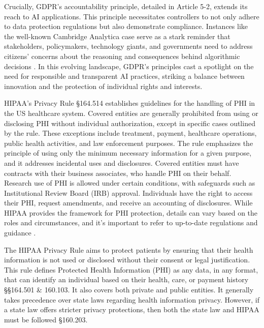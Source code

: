 \documentclass{article}
\begin{document}
Crucially, GDPR's accountability principle, detailed in Article 5-2, extends its reach to AI applications. This principle necessitates controllers to not only adhere to data protection regulations but also demonstrate compliance. Instances like the well-known Cambridge Analytica case serve as a stark reminder that stakeholders, policymakers, technology giants, and governments need to address citizens' concerns about the reasoning and consequences behind algorithmic decisions \cite{hijmans2018ethical}.
In this evolving landscape, GDPR's principles cast a spotlight on the need for responsible and transparent AI practices, striking a balance between innovation and the protection of individual rights and interests.

HIPAA's Privacy Rule §164.514 establishes guidelines for the handling of PHI in the US healthcare system. Covered entities are generally prohibited from using or disclosing PHI without individual authorization, except in specific cases outlined by the rule. These exceptions include treatment, payment, healthcare operations, public health activities, and law enforcement purposes. The rule emphasizes the principle of using only the minimum necessary information for a given purpose, and it addresses incidental uses and disclosures. Covered entities must have contracts with their business associates, who handle PHI on their behalf. Research use of PHI is allowed under certain conditions, with safeguards such as Institutional Review Board (IRB) approval. Individuals have the right to access their PHI, request amendments, and receive an accounting of disclosures. While HIPAA provides the framework for PHI protection, details can vary based on the roles and circumstances, and it's important to refer to up-to-date regulations and guidance \cite{cohen2020ethical}.

The HIPAA Privacy Rule aims to protect patients by ensuring that their health information is not used or disclosed without their consent or legal justification. This rule defines Protected Health Information (PHI) as any data, in any format, that can identify an individual based on their health, care, or payment history §§164.501 \& 160.103. It also covers both private and public entities. It generally takes precedence over state laws regarding health information privacy. However, if a state law offers stricter privacy protections, then both the state law and HIPAA must be followed §160.203.
\end{document}
